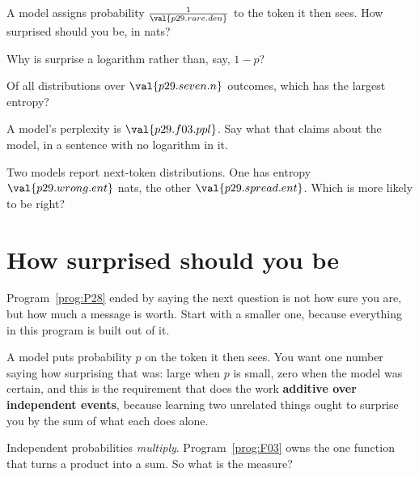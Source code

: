 \begin{quiz}
\item A model assigns probability $\frac{1}{\val{p29.rare.den}}$ to the token
  it then sees. How surprised should you be, in nats? 
\item Why is surprise a logarithm rather than, say, $1 - p$?
\item Of all distributions over $\val{p29.seven.n}$ outcomes, which has the
  largest entropy? 
\item A model's perplexity is $\val{p29.f03.ppl}$. Say what that claims about
  the model, in a sentence with no logarithm in it. 
\item Two models report next-token distributions. One has entropy
  $\val{p29.wrong.ent}$ nats, the other $\val{p29.spread.ent}$. Which is more
  likely to be right? 
\end{quiz}

\section{How surprised should you be}
\label{sec:P29-surprise}

\begin{fr}
Program~\ref{prog:P28} ended by saying the next question is not how sure you
are, but how much a message is worth. Start with a smaller one, because
everything in this program is built out of it.

A model puts probability $p$ on the token it then sees. You want one number
saying how surprising that was: large when $p$ is small, zero when the model
was certain, and \dash{} this is the requirement that does the work \dash{}
\textbf{additive over independent events}, because learning two unrelated
things ought to surprise you by the sum of what each does alone.

Independent probabilities \emph{multiply}. Program~\ref{prog:F03} owns the one
function that turns a product into a sum. So what is the measure?
\dotline
\nextframe
\end{fr}

